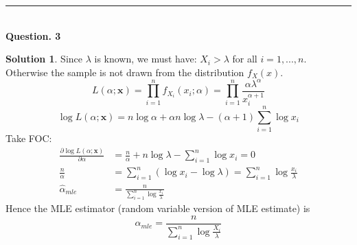 \documentclass[a4paper, 10pt]{article}
\theoremstyle{definition}
\theoremstyle{hSol}
\newtheorem*{solution}{Solution}
\begin{document}
\noindent\rule{16cm}{0.4pt}
~\\
\textbf{Question. 3}
\begin{solution} Since $\lambda$ is known, we must have: $X_i>\lambda$ for all $i=1,...,n$. Otherwise the sample is not drawn from the distribution $f_X(x)$.
\begin{equation}
  L(\alpha; \bm{x}) = \prod_{i=1}^n f_{X_i}(x_i;\alpha) = \prod_{i=1}^n \frac{\alpha \lambda^{\alpha}}{x_i^{\alpha+1}} 
\end{equation}
\begin{equation}
  \log L(\alpha ; \bm{x}) = n\log \alpha + \alpha n\log \lambda -(\alpha +1)\sum_{i=1}^n \log x_i
\end{equation}
Take FOC: 
\begin{equation}
  \begin{split}
    \frac{\partial \log L(\alpha; \bm{x})}{\partial \alpha} &= \frac{n}{\alpha} + n \log \lambda - \sum_{i=1}^n \log x_i = 0 \\
    \frac{n}{\alpha} &= \sum_{i=1}^n \left(\log x_i - \log \lambda\right)  = \sum_{i=1}^n \log\frac{x_i}{\lambda} \\
    \hat{\alpha }_{mle} & = \frac{n}{\sum_{i=1}^n \log\frac{x_i}{\lambda}}
  \end{split}
\end{equation}
Hence the MLE estimator (random variable version of MLE estimate) is 
$$
\hat{\alpha}_{mle} = \frac{n}{\sum_{i=1}^n \log\frac{X_i}{\lambda}}
$$
\end{solution}
\end{document}
